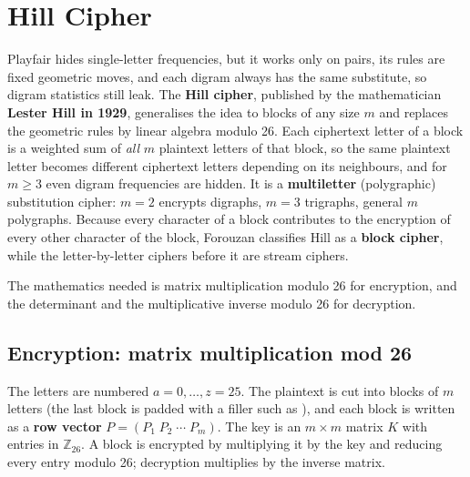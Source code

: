 \section{Hill Cipher}\label{sec:hill}

Playfair hides single-letter frequencies, but it works only on pairs, its rules are fixed geometric moves, and each digram always has the same substitute, so digram statistics still leak. The \textbf{Hill cipher}, published by the mathematician \textbf{Lester Hill in 1929}, generalises the idea to blocks of any size $m$ and replaces the geometric rules by linear algebra modulo 26. Each ciphertext letter of a block is a weighted sum of \emph{all} $m$ plaintext letters of that block, so the same plaintext letter becomes different ciphertext letters depending on its neighbours, and for $m \ge 3$ even digram frequencies are hidden. It is a \textbf{multiletter} (polygraphic) substitution cipher: $m = 2$ encrypts digraphs, $m = 3$ trigraphs, general $m$ polygraphs. Because every character of a block contributes to the encryption of every other character of the block, Forouzan classifies Hill as a \textbf{block cipher}, while the letter-by-letter ciphers before it are stream ciphers.

The mathematics needed is matrix multiplication modulo 26 for encryption, and the determinant and the multiplicative inverse modulo 26 for decryption.

\subsection{Encryption: matrix multiplication mod 26}
The letters are numbered $a = 0, \dots, z = 25$. The plaintext is cut into blocks of $m$ letters (the last block is padded with a filler such as ), and each block is written as a \textbf{row vector} $P = (P_1\;P_2\;\cdots\;P_m)$. The key is an $m \times m$ matrix $K$ with entries in $\mathbb{Z}_{26}$. A block is encrypted by multiplying it by the key and reducing every entry modulo 26; decryption multiplies by the inverse matrix.

